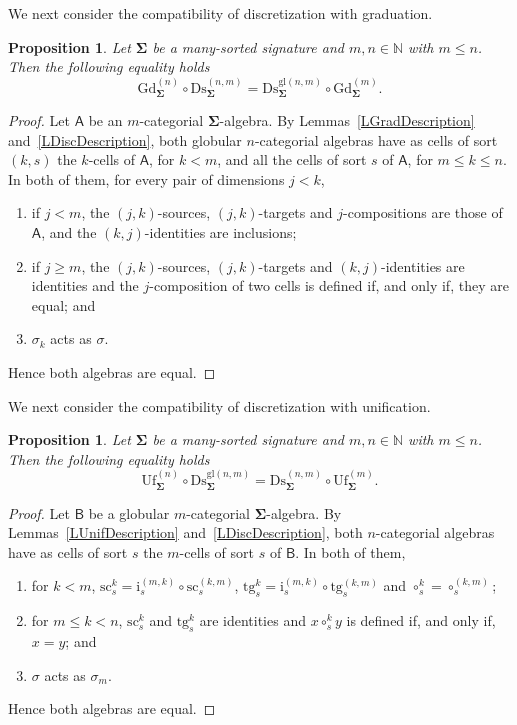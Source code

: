\documentclass[a4paper, reqno
]{amsart}
\newcommand{\sig}[1]{\mathbf{#1}}             %
\newcommand{\calg}[1]{\boldsymbol{\mathsf{#1}}} %
\newcommand{\gl}{\mathrm{gl}}                %
\newcommand{\src}{\mathrm{sc}}
\newcommand{\tgt}{\mathrm{tg}}
\newcommand{\Gd}{\mathrm{Gd}}
\newcommand{\Uf}{\mathrm{Uf}}
\newcommand{\Ds}{\mathrm{Ds}}
\theoremstyle{plain}
\newtheorem{proposition}[theorem]{Proposition}
\theoremstyle{definition}
\begin{document}
We next consider the compatibility of discretization with graduation.

\begin{proposition}\label{PCompatGdDs}
Let $\sig{\Sigma}$ be a many-sorted signature and $m,n\in\mathbb{N}$ with $m\leq n$.
Then the following equality holds
$$
\Gd^{(n)}_{\sig{\Sigma}}\circ\Ds^{(n,m)}_{\sig{\Sigma}}=\Ds^{\gl(n,m)}_{\sig{\Sigma}}\circ\Gd^{(m)}_{\sig{\Sigma}}.
$$
\end{proposition}
\begin{proof}
Let $\calg{A}$ be an $m$-categorial $\sig{\Sigma}$-algebra.
By Lemmas~\ref{LGradDescription} and~\ref{LDiscDescription}, both globular $n$-categorial algebras have as cells of sort $(k,s)$ the $k$-cells of $\calg{A}$, for $k<m$, and all the cells of sort $s$ of $\calg{A}$, for $m\leq k\leq n$.
In both of them, for every pair of dimensions $j<k$,
\begin{enumerate}
\item if $j<m$, the $(j,k)$-sources, $(j,k)$-targets and $j$-compositions are those of $\calg{A}$, and the $(k,j)$-identities are inclusions;
\item if $j\geq m$, the $(j,k)$-sources, $(j,k)$-targets and $(k,j)$-identities are identities and the $j$-composition of two cells is defined if, and only if, they are equal; and
\item $\sigma_{k}$ acts as $\sigma$.
\end{enumerate}
Hence both algebras are equal.
\end{proof}

We next consider the compatibility of discretization with unification.

\begin{proposition}\label{PCompatUfDs}
Let $\sig{\Sigma}$ be a many-sorted signature and $m,n\in\mathbb{N}$ with $m\leq n$.
Then the following equality holds
$$
\Uf^{(n)}_{\sig{\Sigma}}\circ\Ds^{\gl(n,m)}_{\sig{\Sigma}}=\Ds^{(n,m)}_{\sig{\Sigma}}\circ\Uf^{(m)}_{\sig{\Sigma}}.
$$
\end{proposition}
\begin{proof}
Let $\calg{B}$ be a globular $m$-categorial $\sig{\Sigma}$-algebra.
By Lemmas~\ref{LUnifDescription} and~\ref{LDiscDescription}, both $n$-categorial algebras have as cells of sort $s$ the $m$-cells of sort $s$ of $\calg{B}$.
In both of them,
\begin{enumerate}
\item for $k<m$, $\src^{k}_{s}=\mathrm{i}^{(m,k)}_{s}\circ\src^{(k,m)}_{s}$, $\tgt^{k}_{s}=\mathrm{i}^{(m,k)}_{s}\circ\tgt^{(k,m)}_{s}$ and $\circ^{k}_{s}=\circ^{(k,m)}_{s}$;
\item for $m\leq k<n$, $\src^{k}_{s}$ and $\tgt^{k}_{s}$ are identities and $x\circ^{k}_{s}y$ is defined if, and only if, $x=y$; and
\item $\sigma$ acts as $\sigma_{m}$.
\end{enumerate}
Hence both algebras are equal.
\end{proof}
\end{document}
